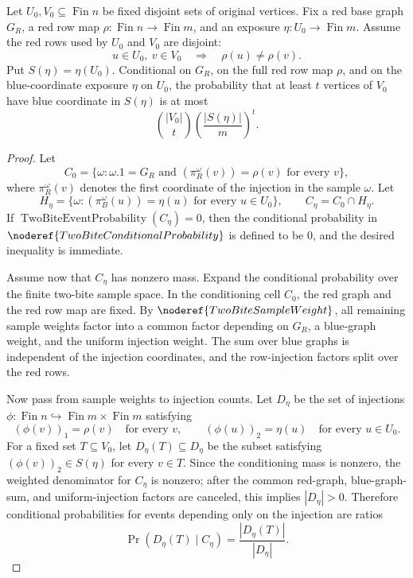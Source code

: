 \begin{lemma}
Let \(U_0,V_0\subseteq\operatorname{Fin}n\) be fixed disjoint sets of
original vertices.  Fix a red base graph \(G_R\), a red row map
\(\rho:\operatorname{Fin}n\to\operatorname{Fin}m\), and an exposure
\(\eta:U_0\to\operatorname{Fin}m\).  Assume the red rows used by \(U_0\) and
\(V_0\) are disjoint:
\[
u\in U_0,\ v\in V_0 \quad\Longrightarrow\quad \rho(u)\ne\rho(v).
\]
Put \(S(\eta)=\eta(U_0)\).  Conditional on \(G_R\), on the full red row map
\(\rho\), and on the blue-coordinate exposure \(\eta\) on \(U_0\), the
probability that at least \(t\) vertices of \(V_0\) have blue coordinate in
\(S(\eta)\) is at most
\[
\binom{|V_0|}{t}\left(\frac{|S(\eta)|}{m}\right)^t .
\]
\end{lemma}
\begin{proof}
Let
\[
C_0=\{\omega:\omega.1=G_R\text{ and }(\pi_R^\omega(v))=\rho(v)
\text{ for every }v\},
\]
where \(\pi_R^\omega(v)\) denotes the first coordinate of the injection in
the sample \(\omega\).  Let
\[
H_\eta=\{\omega:(\pi_B^\omega(u))=\eta(u)\text{ for every }u\in U_0\},
\qquad C_\eta=C_0\cap H_\eta .
\]
If \(\operatorname{TwoBiteEventProbability}(C_\eta)=0\), then the conditional
probability in \(\noderef{TwoBiteConditionalProbability}\) is defined to be
\(0\), and the desired inequality is immediate.

Assume now that \(C_\eta\) has nonzero mass.  Expand the conditional
probability over the finite two-bite sample space.  In the conditioning cell
\(C_0\), the red graph and the red row map are fixed.  By
\(\noderef{TwoBiteSampleWeight}\), all remaining sample weights factor into a
common factor depending on \(G_R\), a blue-graph weight, and the uniform
injection weight.  The sum over blue graphs is independent of the injection
coordinates, and the row-injection factors split over the red rows.

Now pass from sample weights to injection counts.  Let \(D_\eta\) be the set
of injections \(\phi:\operatorname{Fin}n\hookrightarrow
\operatorname{Fin}m\times\operatorname{Fin}m\) satisfying
\[
(\phi(v))_1=\rho(v)\quad\text{for every }v,
\qquad
(\phi(u))_2=\eta(u)\quad\text{for every }u\in U_0.
\]
For a fixed set \(T\subseteq V_0\), let \(D_\eta(T)\subseteq D_\eta\) be the
subset satisfying \((\phi(v))_2\in S(\eta)\) for every \(v\in T\).  Since the
conditioning mass is nonzero, the weighted denominator for \(C_\eta\) is
nonzero; after the common red-graph, blue-graph-sum, and uniform-injection
factors are canceled, this implies \(|D_\eta|>0\).  Therefore conditional
probabilities for events depending only on the injection are ratios
\[
\Pr(D_\eta(T)\mid C_\eta)=\frac{|D_\eta(T)|}{|D_\eta|}.
\]


\end{proof}
